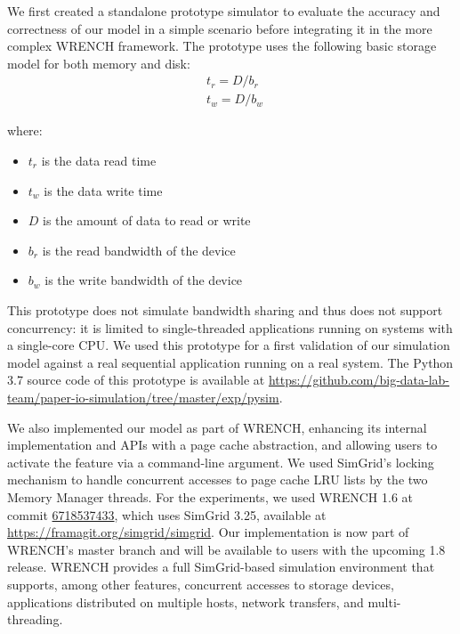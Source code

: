 \documentclass[conference]{IEEEtran}
\newcommand{\simgrid}{SimGrid\xspace}
\newcommand{\wrench}{WRENCH\xspace}
\begin{document}
            We first created a standalone prototype
            simulator to evaluate the accuracy and correctness of our
            model in a simple scenario before integrating it in the more complex
            \wrench framework.
            The prototype uses the following basic storage model for
            both memory and disk:
            \begin{align*}
                & t_{r} = D / b_r \\
                & t_{w} = D / b_w\
            \end{align*}

            where:
            \begin{itemize}
                \item $t_{r}$ is the data read time
                \item $t_{w}$ is the data write time
                \item $D$ is the amount of data to read or write
                \item $b_r$ is the read bandwidth of the device
                \item $b_w$ is the write bandwidth of the device
            \end{itemize}

            This prototype does not simulate  bandwidth sharing and thus does not support
            concurrency: it is limited to single-threaded applications running on systems
            with a single-core CPU. We used this prototype for a first validation of our simulation
            model against a real sequential application running on a real system.
            The Python 3.7 source code of this prototype is available at
            \url{https://github.com/big-data-lab-team/paper-io-simulation/tree/master/exp/pysim}.

            We also implemented our model as part of \wrench, enhancing its
            internal implementation and APIs with a page cache abstraction,
            and allowing users to activate the feature via a command-line
            argument. We used SimGrid's locking mechanism to handle
            concurrent accesses to page cache LRU lists by the two Memory
            Manager threads. For the experiments, we used
            \wrench 1.6 at commit
            \href{https://github.com/wrench-project/wrench/tree/67185374330d2c4bf274fce222c937e838df5b03}{6718537433},
            which uses \simgrid 3.25, available at
            \url{https://framagit.org/simgrid/simgrid}. Our implementation
            is now part of \wrench's master branch and will be available to
            users with the upcoming 1.8 release. \wrench provides a full \simgrid-based simulation 
            environment that supports, among other features, concurrent accesses to storage devices, 
            applications distributed on multiple hosts, network transfers, 
            and multi-threading. 
\end{document}
